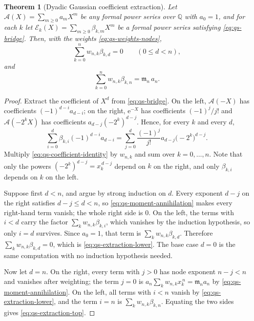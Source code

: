 \documentclass[11pt,oneside]{article}
\newtheorem{theorem}{Theorem}[section]
\theoremstyle{definition}
\theoremstyle{remark}
\newcommand{\Q}{\mathbb Q}
\newcommand{\e}{\mathrm e}
\begin{document}
\begin{theorem}[Dyadic Gaussian coefficient extraction]
\label{thm:qs-extraction}
Let $\mathscr A(X)=\sum_{m\ge0}a_mX^m$ be any formal power series over $\Q$ with $a_0=1$, and
for each $k$ let $\mathscr E_k(X)=\sum_{m\ge0}\beta_{k,m}X^m$ be a formal power series
satisfying \eqref{eq:qs-bridge}.  Then, with the weights \eqref{eq:qs-weights-nodes},
\begin{equation}
 \sum_{k=0}^{n}w_{n,k}\beta_{k,d}=0\qquad(0\le d<n),      \label{eq:qs-extraction-lower}
\end{equation}
and
\begin{equation}
 \sum_{k=0}^{n}w_{n,k}\beta_{k,n}=\mathfrak m_n\,a_n.     \label{eq:qs-extraction-top}
\end{equation}
\end{theorem}

\begin{proof}
Extract the coefficient of $X^d$ from \eqref{eq:qs-bridge}.  On the left, $\mathscr A(-X)$
has coefficients $(-1)^{d-i}a_{d-i}$; on the right, $\e^{-X}$ has coefficients $(-1)^j/j!$
and $\mathscr A(-2^kX)$ has coefficients $a_{d-j}(-2^k)^{d-j}$.  Hence, for every $k$ and
every $d$,
\begin{equation}
 \sum_{i=0}^{d}\beta_{k,i}(-1)^{d-i}a_{d-i}
 =\sum_{j=0}^{d}\frac{(-1)^j}{j!}a_{d-j}\bigl(-2^k\bigr)^{d-j}. \label{eq:qs-coefficient-identity}
\end{equation}
Multiply \eqref{eq:qs-coefficient-identity} by $w_{n,k}$ and sum over $k=0,\ldots,n$.  Note
that only the powers $(-2^k)^{d-j}=x_k^{\,d-j}$ depend on $k$ on the right, and only
$\beta_{k,i}$ depends on $k$ on the left.

Suppose first $d<n$, and argue by strong induction on $d$.  Every exponent $d-j$ on the right
satisfies $d-j\le d<n$, so \eqref{eq:qs-moment-annihilation} makes every right-hand term
vanish; the whole right side is $0$.  On the left, the terms with $i<d$ carry the factor
$\sum_kw_{n,k}\beta_{k,i}$, which vanishes by the induction hypothesis, so only $i=d$
survives.  Since $a_0=1$, that term is $\sum_kw_{n,k}\beta_{k,d}$.  Therefore
$\sum_kw_{n,k}\beta_{k,d}=0$, which is \eqref{eq:qs-extraction-lower}.  The base case $d=0$ is
the same computation with no induction hypothesis needed.

Now let $d=n$.  On the right, every term with $j>0$ has node exponent $n-j<n$ and vanishes
after weighting; the term $j=0$ is $a_n\sum_kw_{n,k}x_k^{\,n}=\mathfrak m_na_n$ by
\eqref{eq:qs-moment-annihilation}.  On the left, all terms with $i<n$ vanish by
\eqref{eq:qs-extraction-lower}, and the term $i=n$ is $\sum_kw_{n,k}\beta_{k,n}$.  Equating
the two sides gives \eqref{eq:qs-extraction-top}.
\end{proof}
\end{document}
